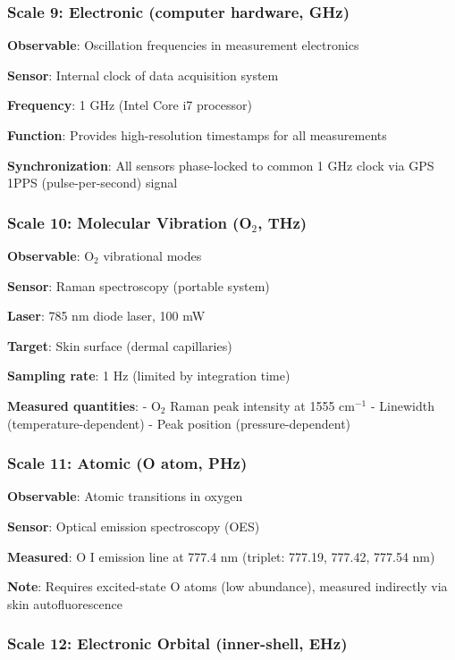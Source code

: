 \documentclass[11pt,onecolumn]{article}
\begin{document}
\subsubsection{Scale 9: Electronic (computer hardware, GHz)}

\textbf{Observable}: Oscillation frequencies in measurement electronics

\textbf{Sensor}: Internal clock of data acquisition system

\textbf{Frequency}: 1 GHz (Intel Core i7 processor)

\textbf{Function}: Provides high-resolution timestamps for all measurements

\textbf{Synchronization}: All sensors phase-locked to common 1 GHz clock via GPS 1PPS (pulse-per-second) signal

\subsubsection{Scale 10: Molecular Vibration (O$_2$, THz)}

\textbf{Observable}: O$_2$ vibrational modes

\textbf{Sensor}: Raman spectroscopy (portable system)

\textbf{Laser}: 785 nm diode laser, 100 mW

\textbf{Target}: Skin surface (dermal capillaries)

\textbf{Sampling rate}: 1 Hz (limited by integration time)

\textbf{Measured quantities}:
- O$_2$ Raman peak intensity at 1555 cm$^{-1}$
- Linewidth (temperature-dependent)
- Peak position (pressure-dependent)

\subsubsection{Scale 11: Atomic (O atom, PHz)}

\textbf{Observable}: Atomic transitions in oxygen

\textbf{Sensor}: Optical emission spectroscopy (OES)

\textbf{Measured}: O I emission line at 777.4 nm (triplet: 777.19, 777.42, 777.54 nm)

\textbf{Note}: Requires excited-state O atoms (low abundance), measured indirectly via skin autofluorescence

\subsubsection{Scale 12: Electronic Orbital (inner-shell, EHz)}
\end{document}
